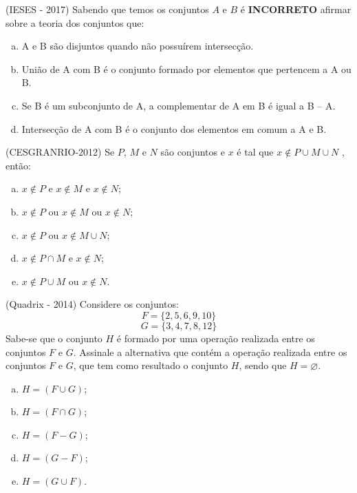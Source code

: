 \begin{exer}
  (IESES - 2017)  Sabendo que temos os conjuntos $A$ e $B$ é \textbf{INCORRETO} afirmar sobre a teoria dos conjuntos que:
  \begin{enumerate}[a)]
  \item A e B são disjuntos quando não possuírem intersecção.
  \item União de A com B é o conjunto formado por elementos que pertencem a A ou B.
  \item Se B é um subconjunto de A, a complementar de A em B é igual a B – A.
  \item Intersecção de A com B é o conjunto dos elementos em comum a A e B.
  \end{enumerate}
\end{exer}

\begin{exer}
  (CESGRANRIO-2012) Se $P$, $M$ e $N$ são conjuntos e $x$ é tal que $x \notin P \cup M \cup N$ , então:
  \begin{enumerate}[a)]
  \item $x \notin P$  e $x  \notin M$  e $x \notin N$;
  \item $x \notin P$ ou $x \notin M$ ou $x \notin N$;
  \item $x \notin P$ ou $x \notin M \cup N$;
  \item $x \notin P \cap M$ e $x \notin N$;
  \item $x \notin P \cup M$ ou $x \notin N$.
  \end{enumerate}
\end{exer}

\begin{exer}
 (Quadrix - 2014)  Considere os conjuntos:
\begin{equation}
F = \{2, 5, 6, 9,10 \}
\end{equation}
\begin{equation}
G = \{3, 4, 7, 8, 12\}
\end{equation}
 Sabe-se que o conjunto $H$ é formado por uma operação realizada entre os conjuntos $F$ e $G$. Assinale a alternativa que  contém a operação realizada entre os conjuntos $F$ e $G$, que tem como resultado o conjunto $H$, sendo que $H = \varnothing$.
 \begin{enumerate}[a)]
  \item $H= (F \cup G)$;
  \item $H= (F \cap G)$;
  \item $H= (F - G)$;
  \item $H= (G - F)$;
  \item $H= (G \cup F)$.
 \end{enumerate}
\end{exer}

